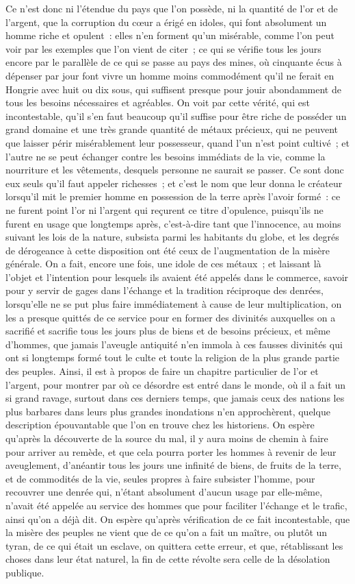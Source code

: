 \documentclass[french,twoside]{book} %
\begin{document}
Ce n’est donc ni l’étendue du pays que l’on possède, ni la quantité de l’or et de l’argent, que la corruption du cœur a érigé en idoles, qui font absolument un homme riche et opulent : elles n’en forment qu’un misérable, comme l’on peut voir par les exemples que l’on vient de citer ; ce qui se vérifie tous les jours encore par le parallèle de ce qui se passe au pays des mines, où cinquante écus à dépenser par jour font vivre un homme moins commodément qu’il ne ferait en Hongrie avec huit ou dix sous, qui suffisent presque pour jouir abondamment de tous les besoins nécessaires et agréables. On voit par cette vérité, qui est incontestable, qu’il s’en faut beaucoup qu’il suffise pour être riche de posséder un grand domaine et une très grande quantité de métaux précieux, qui ne peuvent que laisser périr misérablement leur possesseur, quand l’un n’est point cultivé ; et l’autre ne se peut échanger contre les besoins immédiats de la vie, comme la nourriture et les vêtements, desquels personne ne saurait se passer. Ce sont donc eux seuls qu’il faut appeler richesses ; et c’est le nom que leur donna le créateur lorsqu’il mit le premier homme en possession de la terre après l’avoir formé : ce ne furent point l’or ni l’argent qui reçurent ce titre d’opulence, puisqu’ils ne furent en usage que longtemps après, c’est-à-dire tant que l’innocence, au moins suivant les lois de la nature, subsista parmi les habitants du globe, et les degrés de dérogeance à cette disposition ont été ceux de l’augmentation de la misère générale. On a fait, encore une fois, une idole de ces métaux ; et laissant là l’objet et l’intention pour lesquels ils avaient été appelés dans le commerce, savoir pour y servir de gages dans l’échange et la tradition réciproque des denrées, lorsqu’elle ne se put plus faire immédiatement à cause de leur multiplication, on les a presque quittés de ce service pour en former des divinités auxquelles on a sacrifié et sacrifie tous les jours plus de biens et de besoins précieux, et même d’hommes, que jamais l’aveugle antiquité n’en immola à ces fausses divinités qui ont si longtemps formé tout le culte et toute la religion de la plus grande partie des peuples. Ainsi, il est à propos de faire un chapitre particulier de l’or et l’argent, pour montrer par où ce désordre est entré dans le monde, où il a fait un si grand ravage, surtout dans ces derniers temps, que jamais ceux des nations les plus barbares dans leurs plus grandes inondations n’en approchèrent, quelque description épouvantable que l’on en trouve chez les historiens. On espère qu’après la découverte de la source du mal, il y aura moins de chemin à faire pour arriver au remède, et que cela pourra porter les hommes à revenir de leur aveuglement, d’anéantir tous les jours une infinité de biens, de fruits de la terre, et de commodités de la vie, seules propres à faire subsister l’homme, pour recouvrer une denrée qui, n’étant absolument d’aucun usage par elle-même, n’avait été appelée au service des hommes que pour faciliter l’échange et le trafic, ainsi qu’on a déjà dit. On espère qu’après vérification de ce fait incontestable, que la misère des peuples ne vient que de ce qu’on a fait un maître, ou plutôt un tyran, de ce qui était un esclave, on quittera cette erreur, et que, rétablissant les choses dans leur état naturel, la fin de cette révolte sera celle de la désolation publique.
\end{document}
